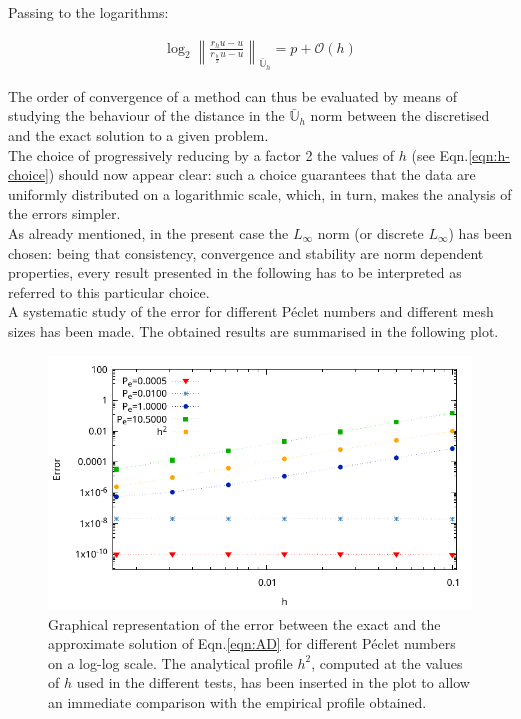 \documentclass[11pt]{article}
\theoremstyle{theorem}
\theoremstyle{definition}
\begin{document}
Passing to the logarithms:

\begin{align}
	\label{eqn:log-conv}
	\log_2\left\|\frac{r_hu-u}{r_{\frac{h}{2}}u-u}\right\|_{\bar{\mathbb{U}}_h}=p+\mathcal{O}(h)
\end{align}

The order of convergence of a method can thus be evaluated by means of studying the behaviour of the distance in the $\bar{\mathbb{U}}_h$ norm between the discretised and the exact solution to a given problem.\\
The choice of progressively reducing by a factor 2 the values of $h$ (see Eqn.\eqref{eqn:h-choice}) should now appear clear: such a choice guarantees that the data are uniformly distributed on a logarithmic scale, which, in turn, makes the analysis of the errors simpler.\\
As already mentioned, in the present case the $L_{\infty}$ norm (or discrete $L_\infty$) has been chosen: being that consistency, convergence and stability are norm dependent properties, every result presented in the following has to be interpreted as referred to this particular choice.\\

A systematic study of the error for different P\'{e}clet numbers and different mesh sizes has been made. The obtained results are summarised in the following plot.\\

\begin{figure}[H]
	\begin{center}
		\includegraphics[width=1.0\textwidth]{ADRer.pdf}
	\end{center}
	\caption{Graphical representation of the error between the exact and the approximate solution of Eqn.\eqref{eqn:AD} for different P\'{e}clet numbers on a log-log scale. The analytical profile $h^2$, computed at the values of $h$ used in the different tests, has been inserted in the plot to allow an immediate comparison with the empirical profile obtained.
		\label{fig:errors}}
\end{figure}
\end{document}
